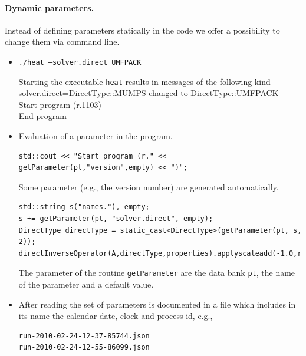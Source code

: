 \documentclass[11pt]{article}
\begin{document}
\paragraph {Dynamic parameters.}
Instead of defining parameters statically in the code we offer a possibility to change them via command line.
\begin{itemize}
\item
{\tt ./heat --solver.direct UMFPACK}

Starting the executable {\tt heat} results in messages of the following kind\\
solver.direct=DirectType::MUMPS changed to DirectType::UMFPACK\\
Start program (r.1103)\\
End program

\item Evaluation of a parameter in the program.

\begin{lstlisting}
std::cout << "Start program (r." << getParameter(pt,"version",empty) << ")"; 
\end{lstlisting}
Some parameter (e.g., the version number) are generated automatically.

\begin{lstlisting}
std::string s("names."), empty;
s += getParameter(pt, "solver.direct", empty);
DirectType directType = static_cast<DirectType>(getParameter(pt, s, 2));
directInverseOperator(A,directType,properties).applyscaleadd(-1.0,rhs,solution);
\end{lstlisting}

The parameter of the routine {\tt getParameter} are the data bank {\tt pt}, the name 
of the  parameter and a default value.

\item After reading the set of parameters is documented in a file which includes
in its name the calendar date, clock and process id, e.g.,
\begin{scriptsize}
\begin{verbatim}
run-2010-02-24-12-37-85744.json
run-2010-02-24-12-55-86099.json
\end{verbatim}
\end{scriptsize}


\end{itemize}
\end{document}
